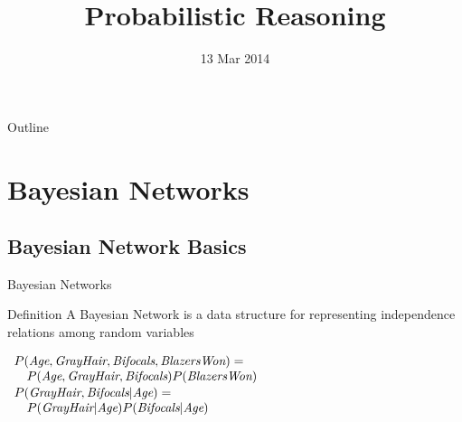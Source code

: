 \documentclass[14pt]{beamer}
\title{Probabilistic Reasoning}
\date{13 Mar 2014}
\begin{document}
\begin{frame}
\titlepage
\end{frame}

\begin{frame}{Outline}
\tableofcontents
\end{frame}

\section{Bayesian Networks}

\subsection{Bayesian Network Basics}

\begin{frame}[label=bayes-net-definition]{Bayesian Networks}
\begin{block}{Definition}
A \alert{Bayesian Network} is a data structure for representing independence relations among random variables
\end{block}
\begin{center}
\end{center}
\pause
$
\begin{array}{ll}
\lefteqn{P(\textit{Age}, \textit{GrayHair}, \textit{Bifocals}, \textit{BlazersWon}) = \mbox{}}\\ 
& P(\textit{Age}, \textit{GrayHair}, \textit{Bifocals})P(\textit{BlazersWon})
\end{array}
$
\pause
\smallskip
$
\begin{array}{ll}
\lefteqn{P(\textit{GrayHair},\textit{Bifocals}|\textit{Age}) = \mbox{}}\\ 
& P(\textit{GrayHair}|\textit{Age})P(\textit{Bifocals}|\textit{Age})
\end{array}
$ \\
\end{frame}
\end{document}
